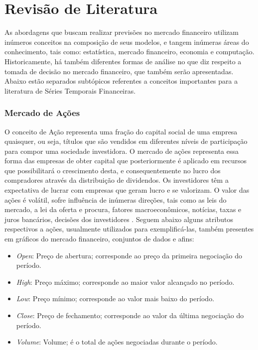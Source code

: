 \chapter{Revisão de Literatura}

\par
As abordagens que buscam realizar previsões no mercado financeiro utilizam inúmeros conceitos na composição de seus modelos, e tangem inúmeras áreas do conhecimento, tais como: estatística, mercado financeiro, economia e computação. Historicamente, há também diferentes formas de análise no que diz respeito a tomada de decisão no mercado financeiro, que também serão apresentadas. Abaixo estão separados subtópicos referentes a conceitos importantes para a literatura de Séries Temporais Financeiras.

\subsection{\textbf{Mercado de Ações}}

\par
O conceito de Ação representa uma fração do capital social de uma empresa quaisquer, ou seja, títulos que são vendidos em diferentes níveis de participação para compor uma sociedade investidora. O mercado de ações representa essa forma das empresas de obter capital que posteriormente é aplicado em recursos que possibilitará o crescimento desta, e consequentemente no lucro dos compradores através da distribuição de dividendos. Os investidores têm a expectativa de lucrar com empresas que geram lucro e se valorizam. O valor das ações é volátil, sofre influência de inúmeras direções, tais como as leis do mercado, a lei da oferta e procura, fatores macroeconômicos, notícias, taxas e juros bancários, decisões dos investidores \cite{chenZhao13}. Seguem abaixo alguns atributos respectivos a ações, usualmente utilizados para exemplificá-las, também presentes em gráficos do mercado financeiro, conjuntos de dados e afins:

\begin{itemize}
\item{\textit{Open}}: Preço de abertura; corresponde ao preço da primeira negociação do período.
\item{\textit{High}}: Preço máximo; corresponde ao maior valor alcançado no período.
\item{\textit{Low}}: Preço mínimo; corresponde ao valor mais baixo do período.
\item{\textit{Close}}: Preço de fechamento; corresponde ao valor da última negociação do período.
\item{\textit{Volume}}: Volume; é o total de ações negociadas durante o período.
\end{itemize}

